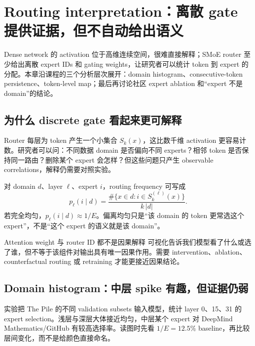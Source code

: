 \section{Routing interpretation：离散 gate 提供证据，但不自动给出语义}

Dense network 的 activation 位于高维连续空间，很难直接解释；SMoE router 至少给出离散 expert IDs 和 gating weights，让研究者可以统计 token 到 expert 的分配。本章沿课程的三个分析层次展开：domain histogram、consecutive-token persistence、token-level map；最后再讨论社区 expert ablation 和“expert 不是 domain”的结论。

\subsection{为什么 discrete gate 看起来更可解释}

Router 每层为 token 产生一个小集合 $S_k(x)$，这比数千维 activation 更容易计数。研究者可以问：不同数据 domain 是否偏向不同 experts？相邻 token 是否保持同一路由？删除某个 expert 会怎样？但这些问题只产生 observable correlations，解释仍需要对照实验。


对 domain $d$、layer $\ell$、expert $i$，routing frequency 可写成
\[
p_{\ell}(i\mid d)=\frac{\#\{x\in d:i\in S_k^{(\ell)}(x)\}}{k\,|d|}.
\]
若完全均匀，$p_{\ell}(i\mid d)\approx 1/E$。偏离均匀只是“该 domain 的 token 更常选这个 expert”，不是“这个 expert 的语义就是该 domain”。

\begin{warningbox}{Attention weight 与 router ID 都不是因果解释}
可视化告诉我们模型看了什么或选了谁，但不等于该组件对输出具有唯一因果作用。需要 intervention、ablation、counterfactual routing 或 retraining 才能更接近因果结论。
\end{warningbox}


\subsection{Domain histogram：中层 spike 有趣，但证据仍弱}

实验把 The Pile 的不同 validation subsets 输入模型，统计 layer 0、15、31 的 expert selection。浅层与深层大体接近均匀，中层某个 expert 对 DeepMind Mathematics/GitHub 有较高选择率。读图时先看 $1/E=12.5\%$ baseline，再比较层间变化，而不是给颜色直接命名。

